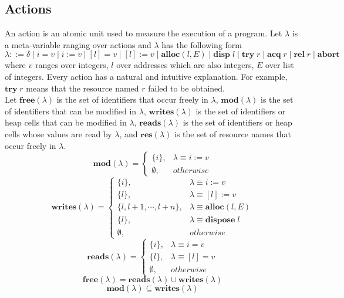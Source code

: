\documentclass{lmcs} %
\theoremstyle{plain}\newtheorem{satz}[thm]{Satz} %
\begin{document}
\subsection*{Actions}
An action is an atomic unit used to measure the execution of a program. Let $\lambda$ is a meta-variable ranging over actions and $\lambda$ has the following form
$$\lambda::=\delta\mid i=v\mid i:=v\mid [l]=v \mid [l]:=v \mid \mathbf{alloc}(l,E)\mid \mathbf{disp}\;l\mid \mathbf{try}\;r\mid \mathbf{acq}\;r \mid \mathbf{rel}\;r \mid \mathbf{abort}$$
where $v$ ranges over integers, $l$ over addresses which are also integers, $E$ over list of integers. Every action has a natural and intuitive explanation. For example, $\mathbf{try}\;r$ means that the resource named $r$ failed to be obtained.\\
Let $\mathbf{free}(\lambda)$ is the set of identifiers that occur freely in $\lambda$, $\mathbf{mod}(\lambda)$ is the set of identifiers that can be modified in $\lambda$, $\mathbf{writes}(\lambda)$ is the set of identifiers or heap cells that can be modified in $\lambda$, $\mathbf{reads}(\lambda)$ is the set of identifiers or heap cells whose values are read by $\lambda$, and $\mathbf{res}(\lambda)$ is the set of resource names that occur freely in $\lambda$.
\begin{equation*}
\mathbf{mod}(\lambda)=\left\{
             \begin{array}{lc}
             \{i\}, &  \lambda\equiv i:=v\\
             \emptyset, & otherwise
             \end{array}
\right.
\end{equation*}
\begin{equation*}
\mathbf{writes}(\lambda)=\left\{
             \begin{array}{lc}
             \{i\}, &  \lambda\equiv i:=v\\
             \{l\}, &  \lambda\equiv [l]:=v\\
             \{l,l+1,\cdots,l+n\}, &  \lambda\equiv \mathbf{alloc}(l,E)\\
             \{l\}, &  \lambda\equiv \mathbf{dispose}\;l\\
             \emptyset, & otherwise
             \end{array}
\right.
\end{equation*}
\begin{equation*}
\mathbf{reads}(\lambda)=\left\{
             \begin{array}{lc}
             \{i\}, &  \lambda\equiv i=v\\
             \{l\}, &  \lambda\equiv [l]=v\\
             \emptyset, & otherwise
             \end{array}
\right.
\end{equation*}
$$\mathbf{free}(\lambda)=\mathbf{reads}(\lambda)\cup \mathbf{writes}(\lambda)$$
$$\mathbf{mod}(\lambda)\subseteq\mathbf{writes}(\lambda)$$
\end{document}
